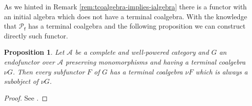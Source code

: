 \documentclass[letterpaper, 11pt, oneside]{memoir}
\theoremstyle{myteo}
\newtheorem{proposition}[theorem]{Proposition}
\numberwithin{equation}{section}
\newcommand{\A}{\mathscr{A}}
\begin{document}
As we hinted in Remark \ref{rem:tcoalgebra-implies-ialgebra} there is a functor with an initial algebra which does not have a terminal coalgebra.
With the knowledge that \(\mathcal{P}_{\textsf{f}}\) has a terminal coalgebra and the following proposition we can construct directly such functor.

\begin{proposition}
  \label{prop:subfunctor}
  Let \(\A\) be a complete and well-powered category and \(G\) an endofunctor over \(\A\) preserving monomorphisms and having a terminal coalgebra \(\nu G\).
  Then every subfunctor \(F\) of \(G\) has a terminal coalgebra \(\nu F\) which is always a subobject of \(\nu G\).
\end{proposition}

\begin{proof}
  See \cite[Corollary 7.2.10]{coalgebrabook}.
\end{proof}
\end{document}
